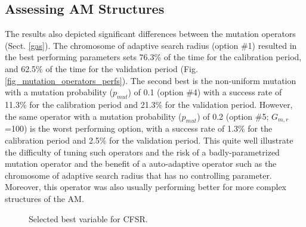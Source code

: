 \documentclass[draft]{agujournal2019}
\begin{document}
\subsection{Assessing AM Structures}
\label{structures}




The results also depicted significant differences between the mutation operators (Sect. \ref{gas}). The chromosome of adaptive search radius (option \#1) resulted in the best performing parameters sets 76.3\% of the time for the calibration period, and 62.5\% of the time for the validation period (Fig. \ref{fig_mutation_operators_perfs}).  The second best is the non-uniform mutation with a mutation probability ($p_{mut}$) of 0.1 (option \#4) with a success rate of 11.3\% for the calibration period and 21.3\% for the validation period. However, the same operator with a  mutation probability ($p_{mut}$) of 0.2 (option \#5; $G_{m,r}$=100) is the worst performing option, with a success rate of 1.3\% for the calibration period and 2.5\% for the validation period. This quite well illustrate the difficulty of tuning such operators and the risk of a badly-parametrized mutation operator and the benefit of a auto-adaptive operator such as the chromosome of adaptive search radius that has no controlling parameter. Moreover, this operator was also usually performing better for more complex structures of the AM.




\begin{figure}[hbt]
	\noindent{}
	\caption{Selected best variable for CFSR.}
	\label{fig_structures}
\end{figure}
\end{document}

